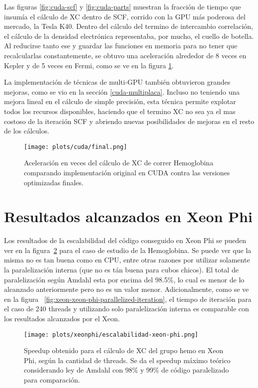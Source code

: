 Las figuras \ref{fig:cuda-scf} y \ref{fig:cuda-parts} muestran la fracci\'on de tiempo que insum\'ia el
c\'alculo de XC dentro de SCF, corrido con la GPU m\'as poderosa del mercado, la \nvidia{} Tesla K40.
Dentro del c\'alculo del termino de intercambio correlaci\'on, el c\'alculo de la densidad electr\'onica
representaba, por mucho, el cuello de botella. Al reducirse tanto ese y guardar las funciones en
memoria para no tener que recalcularlas constantemente, se obtuvo una aceleraci\'on alrededor de 8
veces en Kepler y de 5 veces en Fermi, como se ve en la figura \ref{fig:cuda-final}.

La implementaci\'on de t\'ecnicas de multi-GPU tambi\'en obtuvieron grandes mejoras, como se vio en la
secci\'on \ref{cuda-multiplaca}. Incluso no teniendo una mejora lineal en el c\'alculo de simple
precisi\'on, esta t\'ecnica permite explotar todos los recursos disponibles, haciendo que el termino
XC no sea ya el mas costoso de la iteraci\'on SCF y abriendo nuevas posibilidades de mejoras en el
resto de los c\'alculos.

\begin{figure}[htbp]
   \centering
   \texttt{[image: plots/cuda/final.png]}
   \caption{Aceleraci\'on en veces del c\'alculo de XC de correr Hemoglobina comparando implementaci\'on original en CUDA contra
   las versiones optimizadas finales.}
   \label{fig:cuda-final}
\end{figure}


\section{Resultados alcanzados en Xeon Phi}

Los resultados de la escalabilidad del c\'odigo conseguido en Xeon Phi se pueden ver
en la figura~\ref{fig:xeon-final-scalability} para el caso de estudio de la Hemoglobina.
Se puede ver que la misma no es tan buena como en CPU, entre otras razones por utilizar
solamente la paralelizaci\'on interna (que no es t\'an buena para cubos chicos). El total de paralelizaci\'on seg\'un
Amdahl esta por encima del 98.5\%, lo cual es menor de lo alcanzado anteriormente
pero no es un valor menor. Adicionalmente, como se ve en la figura
~\ref{fig:xeon-xeon-phi-parallelized-iteration}, el tiempo de iteraci\'on
para el caso de 240 threads y utilizando solo paralelizaci\'on interna es
comparable con los resultados alcanzados por el Xeon.

\begin{figure}[htbp]
   \centering
   \texttt{[image: plots/xeonphi/escalabilidad-xeon-phi.png]}
   \caption{Speedup obtenido para el c\'alculo de XC del grupo hemo en Xeon Phi,
   seg\'un la cantidad de threads. Se da el speedup m\'aximo te\'orico considerando ley de Amdahl
   con 98\% y 99\% de c\'odigo paralelizado para comparaci\'on.}
   \label{fig:xeon-final-scalability}
\end{figure}

